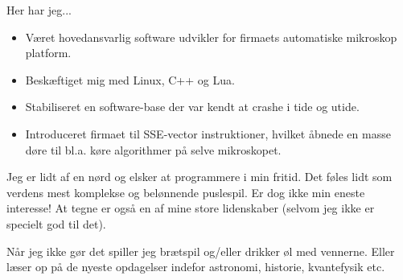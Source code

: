 \documentclass[10pt,a4paper,ragged2e]{altacv}
\begin{document}
Her har jeg...

\begin{itemize}
\item Været hovedansvarlig software udvikler for firmaets automatiske mikroskop platform.
\item Beskæftiget mig med Linux, C++ og Lua.
\item Stabiliseret en software-base der var kendt at crashe i tide og utide.
\item Introduceret firmaet til SSE-vector instruktioner, hvilket åbnede en masse døre til bl.a. køre algorithmer på selve mikroskopet.
\end{itemize}


Jeg er lidt af en nørd og elsker at programmere i min fritid. Det føles lidt som verdens mest komplekse og belønnende puslespil. Er dog ikke min eneste interesse! At tegne er også en af mine store lidenskaber (selvom jeg ikke er specielt god til det).

Når jeg ikke gør det spiller jeg brætspil og/eller drikker øl med vennerne. Eller læser op på de nyeste opdagelser indefor astronomi, historie, kvantefysik etc.

\clearpage


\nocite{*}


\printbibliography[heading=pubtype,title={\printinfo{\faFileTextO}{Journal Articles}}, type=article]

\divider

\printbibliography[heading=pubtype,title={\printinfo{\faGroup}{Conference Proceedings}},type=inproceedings]
\end{document}

